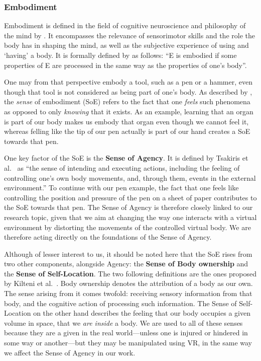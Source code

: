 \subsubsection{Embodiment}
\label{sec:embodiment}
Embodiment is defined in the field of cognitive neuroscience and philosophy of the mind by \cite{blanke2009full,debarba2017embodiment}. It encompasses the relevance of sensorimotor skills and the role the body has in shaping the mind, as well as the subjective experience of using and `having' a body. It is formally defined by \cite{de2011embodiment} as follows: ``E is embodied if some properties of E are processed in the same way as the properties of one’s body''.

One may from that perspective embody a tool, such as a pen or a hammer, even though that tool is not considered as being part of one's body. As described by \cite{de2011embodiment}, the \textit{sense} of embodiment (SoE) refers to the fact that one \textit{feels} such phenomena as opposed to only \textit{knowing} that it exists. As an example, learning that an organ is part of our body makes us embody that organ even though we cannot feel it, whereas felling like the tip of our pen actually is part of our hand creates a SoE towards that pen.

One key factor of the SoE is the \textbf{Sense of Agency}. It is defined by Tsakiris et al.\ \cite{tsakiris2006having} as ``the sense of intending and executing actions, including the feeling of controlling one’s own body movements, and, through them, events in the external environment.'' To continue with our pen example, the fact that one feels like controlling the position and pressure of the pen on a sheet of paper contributes to the SoE towards that pen. The Sense of Agency is therefore closely linked to our research topic, given that we aim at changing the way one interacts with a virtual environment by distorting the movements of the controlled virtual body. We are therefore acting directly on the foundations of the Sense of Agency.

Although of lesser interest to us, it should be noted here that the SoE rises from two other components, alongside Agency: the \textbf{Sense of Body ownership} and the \textbf{Sense of Self-Location}. The two following definitions are the ones proposed by Kilteni et al.\ \cite{kilteni2012sense}. Body ownership denotes the attribution of a body as our own. The sense arising from it comes twofold: receiving sensory information from that body, and the cognitive action of processing such information. The Sense of Self-Location on the other hand describes the feeling that our body occupies a given volume in space, that we \textit{are inside} a body. We are used to all of these senses because they are a given in the real world---unless one is injured or hindered in some way or another---but they may be manipulated using VR, in the same way we affect the Sense of Agency in our work.

